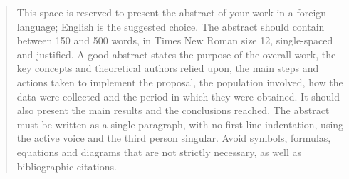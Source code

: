 
\begin{abstract}
This space is reserved to present the abstract of your work in a foreign
language; English is the suggested choice. The abstract should contain between
150 and 500 words, in Times New Roman size 12, single-spaced and justified. A
good abstract states the purpose of the overall work, the key concepts and
theoretical authors relied upon, the main steps and actions taken to implement
the proposal, the population involved, how the data were collected and the
period in which they were obtained. It should also present the main results and
the conclusions reached. The abstract must be written as a single paragraph,
with no first-line indentation, using the active voice and the third person
singular. Avoid symbols, formulas, equations and diagrams that are not strictly
necessary, as well as bibliographic citations.
\end{abstract}

